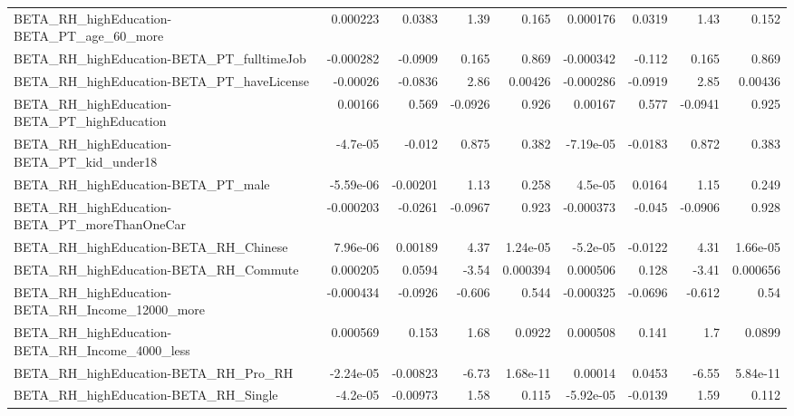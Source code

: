 \begin{tabular}{lrrrrrrrr}
BETA\_RH\_highEducation-BETA\_PT\_age\_60\_more          &    0.000223 &       0.0383 &      1.39 &    0.165 &   0.000176 &      0.0319 &         1.43 &         0.152 \\
BETA\_RH\_highEducation-BETA\_PT\_fulltimeJob          &   -0.000282 &      -0.0909 &     0.165 &    0.869 &  -0.000342 &      -0.112 &        0.165 &         0.869 \\
BETA\_RH\_highEducation-BETA\_PT\_haveLicense          &    -0.00026 &      -0.0836 &      2.86 &  0.00426 &  -0.000286 &     -0.0919 &         2.85 &       0.00436 \\
BETA\_RH\_highEducation-BETA\_PT\_highEducation        &     0.00166 &        0.569 &   -0.0926 &    0.926 &    0.00167 &       0.577 &      -0.0941 &         0.925 \\
BETA\_RH\_highEducation-BETA\_PT\_kid\_under18          &    -4.7e-05 &       -0.012 &     0.875 &    0.382 &  -7.19e-05 &     -0.0183 &        0.872 &         0.383 \\
BETA\_RH\_highEducation-BETA\_PT\_male                 &   -5.59e-06 &     -0.00201 &      1.13 &    0.258 &    4.5e-05 &      0.0164 &         1.15 &         0.249 \\
BETA\_RH\_highEducation-BETA\_PT\_moreThanOneCar       &   -0.000203 &      -0.0261 &   -0.0967 &    0.923 &  -0.000373 &      -0.045 &      -0.0906 &         0.928 \\
BETA\_RH\_highEducation-BETA\_RH\_Chinese              &    7.96e-06 &      0.00189 &      4.37 & 1.24e-05 &   -5.2e-05 &     -0.0122 &         4.31 &      1.66e-05 \\
BETA\_RH\_highEducation-BETA\_RH\_Commute              &    0.000205 &       0.0594 &     -3.54 & 0.000394 &   0.000506 &       0.128 &        -3.41 &      0.000656 \\
BETA\_RH\_highEducation-BETA\_RH\_Income\_12000\_more    &   -0.000434 &      -0.0926 &    -0.606 &    0.544 &  -0.000325 &     -0.0696 &       -0.612 &          0.54 \\
BETA\_RH\_highEducation-BETA\_RH\_Income\_4000\_less     &    0.000569 &        0.153 &      1.68 &   0.0922 &   0.000508 &       0.141 &          1.7 &        0.0899 \\
BETA\_RH\_highEducation-BETA\_RH\_Pro\_RH               &   -2.24e-05 &     -0.00823 &     -6.73 & 1.68e-11 &    0.00014 &      0.0453 &        -6.55 &      5.84e-11 \\
BETA\_RH\_highEducation-BETA\_RH\_Single               &    -4.2e-05 &     -0.00973 &      1.58 &    0.115 &  -5.92e-05 &     -0.0139 &         1.59 &         0.112 \\

\end{tabular}
